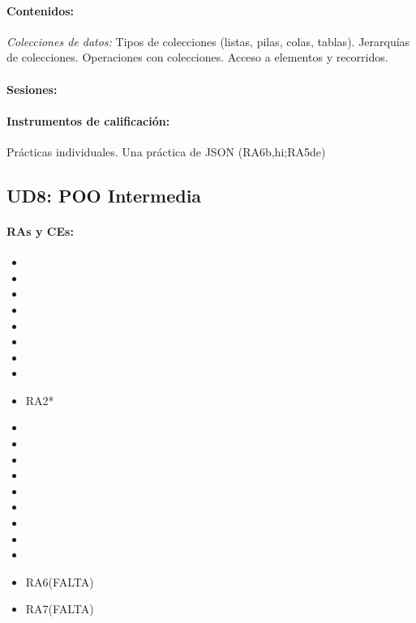 	\paragraph{Contenidos:}
		\emph{Colecciones de datos:}
		Tipos de colecciones (listas, pilas, colas, tablas).
		Jerarquías de colecciones.
		Operaciones con colecciones. Acceso a elementos y recorridos.

	\paragraph{Sesiones:}
	\paragraph{Instrumentos de calificación:}
		Prácticas individuales. 
		Una práctica de JSON (RA6b,hi;RA5de)



\newpage
\subsection{UD8: POO Intermedia}

	\paragraph{RAs y CEs:}
	\begin{itemize}[itemsep=0.1em, topsep=0.1em]
		\item\RAUNOf
		\item\RAUNOi		
		\item\RATRESe
		\item\RATRESf
		\item\RATRESg
		\item\RACINCOa
		\item\RACINCOb
		\item\RACINCOc		
		\item RA2*
		\item\RACUATROa
		\item\RACUATROb
		\item\RACUATROc
		\item\RACUATROd
		\item\RACUATROe
		\item\RACUATROf
		\item\RACUATROg
		\item\RACUATROh
		\item\RACUATROi
		\item RA6(FALTA)
		\item RA7(FALTA)
	\end{itemize}



